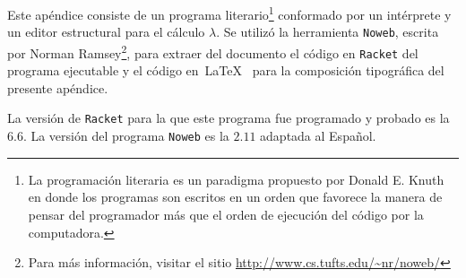 Este apéndice consiste de un programa literario\footnote{La programación literaria es un paradigma propuesto por Donald E. Knuth en donde los programas son escritos en un orden que favorece la manera de pensar del programador más que el orden de ejecución del código por la computadora.} conformado por un intérprete y un editor estructural para el cálculo \( λ \). Se utilizó la herramienta \texttt{Noweb}, escrita por Norman Ramsey\footnote{Para más información, visitar el sitio \url{http://www.cs.tufts.edu/~nr/noweb/}}, para extraer del documento el código en \texttt{Racket} del programa ejecutable y el código en~\LaTeX~ para la composición tipográfica del presente apéndice.

La versión de \texttt{Racket} para la que este programa fue programado y probado es la \( 6.6 \). La versión del programa \texttt{Noweb} es la \( 2.11 \) adaptada al Español.